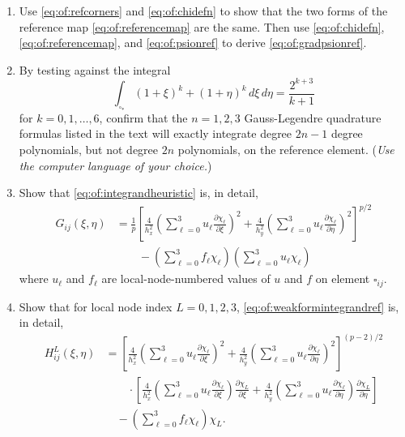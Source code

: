 \begin{enumerate}
\item  Use \eqref{eq:of:refcorners} and \eqref{eq:of:chidefn} to show that the two forms of the reference map \eqref{eq:of:referencemap} are the same.  Then use \eqref{eq:of:chidefn}, \eqref{eq:of:referencemap}, and \eqref{eq:of:psionref} to derive \eqref{eq:of:gradpsionref}.

\item By testing against the integral
    $$\int_{\square_\ast} (1+\xi)^k + (1+\eta)^k\,d\xi\, d\eta = \frac{2^{k+3}}{k+1}$$
for $k=0,1,\dots,6$, confirm that the $n=1,2,3$ Gauss-Legendre quadrature formulas listed in the text will exactly integrate degree $2n-1$ degree polynomials, but not degree $2n$ polynomials, on the reference element.  (\emph{Use the computer language of your choice.})

\item \label{exer:of:integrand}  Show that \eqref{eq:of:integrandheuristic} is, in detail,
\begin{align*}
G_{ij}(\xi,\eta) &= \frac{1}{p} \left[\frac{4}{h_x^2} \left(\sum_{\ell=0}^3 u_\ell \frac{\partial\chi_\ell}{\partial \xi}\right)^2 + \frac{4}{h_y^2} \left(\sum_{\ell=0}^3 u_\ell \frac{\partial\chi_\ell}{\partial \eta}\right)^2\right]^{p/2} \\
  &\qquad - \left(\sum_{\ell=0}^3 f_\ell \chi_\ell\right) \left(\sum_{\ell=0}^3 u_\ell \chi_\ell\right)
\end{align*}
where $u_\ell$ and $f_\ell$ are local-node-numbered values of $u$ and $f$ on element $\square_{ij}$.

\item \label{exer:of:weakformintegrand}  Show that for local node index $L=0,1,2,3$, \eqref{eq:of:weakformintegrandref} is, in detail,
\begin{align*}
H_{ij}^L(\xi,\eta) &= \left[\frac{4}{h_x^2} \left(\sum_{\ell=0}^3 u_\ell \frac{\partial\chi_\ell}{\partial \xi}\right)^2 + \frac{4}{h_y^2} \left(\sum_{\ell=0}^3 u_\ell \frac{\partial\chi_\ell}{\partial \eta}\right)^2\right]^{(p-2)/2} \\
  &\qquad \cdot \left[\frac{4}{h_x^2} \left(\sum_{\ell=0}^3 u_\ell \frac{\partial\chi_\ell}{\partial \xi}\right) \frac{\partial\chi_L}{\partial \xi} + \frac{4}{h_y^2} \left(\sum_{\ell=0}^3 u_\ell \frac{\partial\chi_\ell}{\partial \eta}\right) \frac{\partial\chi_L}{\partial \eta}\right] \\
  &\quad - \left(\sum_{\ell=0}^3 f_\ell \chi_\ell\right) \chi_L.
\end{align*}


\end{enumerate}
